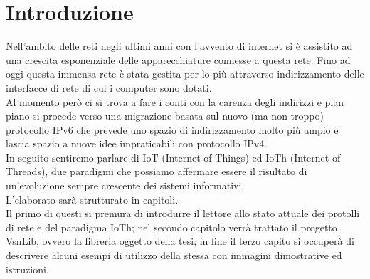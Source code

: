 

\chapter*{Introduzione}                 %


Nell'ambito delle reti negli ultimi anni con l'avvento di internet si \`e assistito ad una crescita esponenziale delle apparecchiature connesse a questa rete.
Fino ad oggi questa immensa rete \`e stata gestita per lo pi\`u attraverso indirizzamento delle interfacce di rete di cui i computer sono dotati.\\
Al momento per\`o ci si trova a fare i conti con la carenza degli indirizzi e pian piano si procede verso una migrazione basata sul nuovo (ma non troppo) protocollo IPv6 che prevede uno spazio di indirizzamento molto pi\`u ampio e lascia spazio a nuove idee impraticabili con protocollo IPv4.\\
In seguito sentiremo parlare di IoT (Internet of Things) ed IoTh (Internet of Threads), due paradigmi che possiamo affermare essere il risultato di un'evoluzione sempre crescente dei sistemi informativi.\\
L'elaborato sar\`a strutturato in capitoli.\\
Il primo di questi si premura di introdurre il lettore allo stato attuale dei protolli di rete e del paradigma IoTh; nel secondo capitolo verr\`a trattato il progetto VsnLib, ovvero la libreria oggetto della tesi; in fine il terzo capito si occuper\`a di descrivere alcuni esempi di utilizzo della stessa con immagini dimostrative ed istruzioni.
\clearpage{\pagestyle{empty}\cleardoublepage}
\tableofcontents                        %
\rhead[\fancyplain{}{\bfseries\leftmark}]{\fancyplain{}{\bfseries\thepage}}
\clearpage{\pagestyle{empty}\cleardoublepage}
\listoffigures                          %
\clearpage{\pagestyle{empty}\cleardoublepage}
\listoftables                           %
\clearpage{\pagestyle{empty}\cleardoublepage} 

